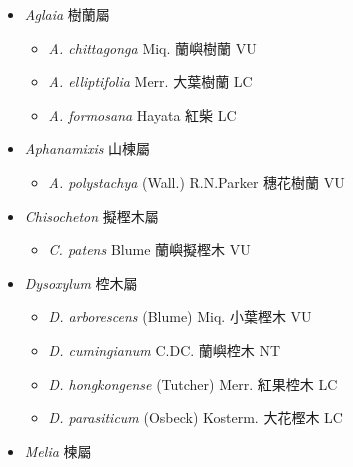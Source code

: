 
  \begin{itemize}
 \item[] \textit{Aglaia} 樹蘭屬
                                
  \begin{itemize}
        \item[] \textit{A. chittagonga} Miq.  蘭嶼樹蘭   VU
        \item[] \textit{A. elliptifolia} Merr.  大葉樹蘭   LC
        \item[] \textit{A. formosana} Hayata  紅柴   LC
  \end{itemize}
 \item[] \textit{Aphanamixis} 山楝屬
                                
  \begin{itemize}
        \item[] \textit{A. polystachya} (Wall.) R.N.Parker  穗花樹蘭   VU
  \end{itemize}
 \item[] \textit{Chisocheton} 擬樫木屬
                                
  \begin{itemize}
        \item[] \textit{C. patens} Blume  蘭嶼擬樫木   VU
  \end{itemize}
 \item[] \textit{Dysoxylum} 椌木屬
                                
  \begin{itemize}
        \item[] \textit{D. arborescens} (Blume) Miq.  小葉樫木   VU
        \item[] \textit{D. cumingianum} C.DC.  蘭嶼椌木   NT
        \item[] \textit{D. hongkongense} (Tutcher) Merr.  紅果椌木   LC
        \item[] \textit{D. parasiticum} (Osbeck) Kosterm.  大花樫木   LC
  \end{itemize}
 \item[] \textit{Melia} 楝屬
                                

\end{itemize}
